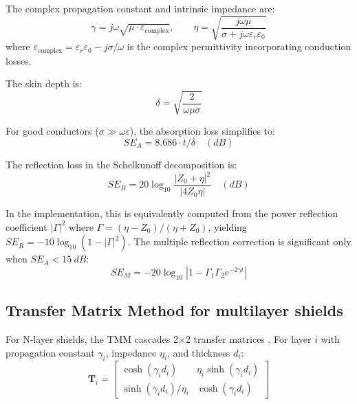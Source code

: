\documentclass[review,3p,authoryear]{elsarticle}
\begin{document}
The complex propagation constant and intrinsic impedance are:
\begin{equation}
\gamma = j\omega\sqrt{\mu \cdot \varepsilon_\mathrm{complex}}, \qquad
\eta = \sqrt{\frac{j\omega\mu}{\sigma + j\omega\varepsilon_r\varepsilon_0}}
\label{eq:gamma_eta}
\end{equation}
where $\varepsilon_\mathrm{complex} = \varepsilon_r\varepsilon_0 - j\sigma/\omega$ is the complex permittivity incorporating conduction losses.

The skin depth is:
\begin{equation}
\delta = \sqrt{\frac{2}{\omega\mu\sigma}}
\label{eq:skin_depth}
\end{equation}

For good conductors ($\sigma \gg \omega\varepsilon$), the absorption loss simplifies to:
\begin{equation}
SE_A = 8.686 \cdot t / \delta \quad (\si{dB})
\label{eq:se_a}
\end{equation}

The reflection loss in the Schelkunoff decomposition is:
\begin{equation}
SE_R = 20\log_{10}\frac{|Z_0 + \eta|^2}{|4Z_0\eta|} \quad (\si{dB})
\label{eq:se_r}
\end{equation}

In the implementation, this is equivalently computed from the power reflection coefficient $|\Gamma|^2$ where $\Gamma = (\eta - Z_0)/(\eta + Z_0)$, yielding $SE_R = -10\log_{10}(1 - |\Gamma|^2)$. The multiple reflection correction is significant only when $SE_A < \SI{15}{dB}$:
\begin{equation}
SE_M = -20\log_{10}|1 - \Gamma_1\Gamma_2 e^{-2\gamma t}|
\label{eq:se_m}
\end{equation}

\subsection{Transfer Matrix Method for multilayer shields}
\label{sec:tmm}

For N-layer shields, the TMM cascades 2$\times$2 transfer matrices \citep{Celozzi2008, Yeh1988}. For layer $i$ with propagation constant $\gamma_i$, impedance $\eta_i$, and thickness $d_i$:
\begin{equation}
\mathbf{T}_i = \begin{bmatrix} \cosh(\gamma_i d_i) & \eta_i \sinh(\gamma_i d_i) \\ \sinh(\gamma_i d_i)/\eta_i & \cosh(\gamma_i d_i) \end{bmatrix}
\label{eq:tmm_matrix}
\end{equation}
\end{document}
